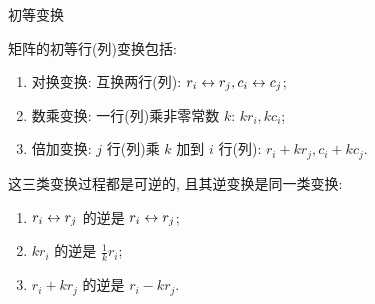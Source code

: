 \begin{frame}{初等变换}
	\onslide<+->
	\begin{definition}
		矩阵的初等行(列)变换包括:
		\begin{enumerate}
			\item 对换变换: 互换两行(列): \alert{$r_i\leftrightarrow r_j, c_i\leftrightarrow c_j$};
			\item 数乘变换: 一行(列)乘非零常数 $k$: \alert{$k r_i, k c_i$};
			\item 倍加变换: $j$ 行(列)乘 $k$ 加到 $i$ 行(列): \alert{$r_i+kr_j, c_i+kc_j$}.
		\end{enumerate}
	\end{definition}
	\onslide<+->
	这三类变换过程都是可逆的, 且其逆变换是同一类变换:
	\begin{enumerate}
		\item $r_i\leftrightarrow r_j$ 的逆是 $r_i\leftrightarrow r_j$;
		\item $kr_i$ 的逆是 $\frac1k r_i$;
		\item $r_i+kr_j$ 的逆是 $r_i-kr_j$.
	\end{enumerate}
\end{frame}


